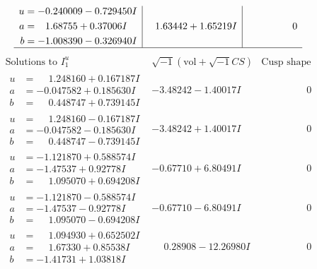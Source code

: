\documentclass[1p]{elsarticle_modified}
\theoremstyle{definition}
\newcommand{\I}{\sqrt{-1}}
\begin{document}
$$\begin{array}{c|c|c}
\begin{aligned}
u &= -0.240009 - 0.729450 I \\
a &= \phantom{-}1.68755 + 0.37006 I \\
b &= -1.008390 - 0.326940 I\end{aligned}
 & \phantom{-}1.63442 + 1.65219 I & \phantom{-0.000000 } 0\\
 \hline 
 \end{array}$$\newpage$$\begin{array}{c|c|c}  
\text{Solutions to }I^u_{1}& \I (\text{vol} + \sqrt{-1}CS) & \text{Cusp shape}\\
 \hline 
\begin{aligned}
u &= \phantom{-}1.248160 + 0.167187 I \\
a &= -0.047582 + 0.185630 I \\
b &= \phantom{-}0.448747 + 0.739145 I\end{aligned}
 & -3.48242 - 1.40017 I & \phantom{-0.000000 } 0 \\ \hline\begin{aligned}
u &= \phantom{-}1.248160 - 0.167187 I \\
a &= -0.047582 - 0.185630 I \\
b &= \phantom{-}0.448747 - 0.739145 I\end{aligned}
 & -3.48242 + 1.40017 I & \phantom{-0.000000 } 0 \\ \hline\begin{aligned}
u &= -1.121870 + 0.588574 I \\
a &= -1.47537 + 0.92778 I \\
b &= \phantom{-}1.095070 + 0.694208 I\end{aligned}
 & -0.67710 + 6.80491 I & \phantom{-0.000000 } 0 \\ \hline\begin{aligned}
u &= -1.121870 - 0.588574 I \\
a &= -1.47537 - 0.92778 I \\
b &= \phantom{-}1.095070 - 0.694208 I\end{aligned}
 & -0.67710 - 6.80491 I & \phantom{-0.000000 } 0 \\ \hline\begin{aligned}
u &= \phantom{-}1.094930 + 0.652502 I \\
a &= \phantom{-}1.67330 + 0.85538 I \\
b &= -1.41731 + 1.03818 I\end{aligned}
 & \phantom{-}0.28908 - 12.26980 I & \phantom{-0.000000 } 0 \\ \hline\begin{aligned}

\end{aligned}
\end{array}$$
\end{document}
